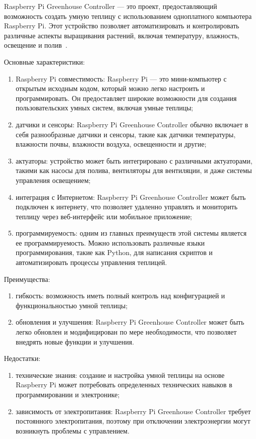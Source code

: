 Raspberry Pi Greenhouse Controller --- это проект, предоставляющий возможность создать умную теплицу с использованием одноплатного компьютера Raspberry Pi. Этот устройство позволяет автоматизировать и контролировать различные аспекты выращивания растений, включая температуру, влажность, освещение и полив~\cite{Raspberry}. 

Основные характеристики:

\begin{enumerate}
    \item Raspberry Pi совместимость: Raspberry Pi --- это мини-компьютер с открытым исходным кодом, который можно легко настроить и программировать. Он предоставляет широкие возможности для создания пользовательских умных систем, включая умные теплицы;
    \item датчики и сенсоры: Raspberry Pi Greenhouse Controller обычно включает в себя разнообразные датчики и сенсоры, такие как датчики температуры, влажности почвы, влажности воздуха, освещенности и другие;
    \item актуаторы: устройство может быть интегрировано с различными актуаторами, такими как насосы для полива, вентиляторы для вентиляции, и даже системы управления освещением;
    \item интеграция с Интернетом: Raspberry Pi Greenhouse Controller может быть подключен к интернету, что позволяет удаленно управлять и мониторить теплицу через веб-интерфейс или мобильное приложение;
    \item программируемость: одним из главных преимуществ этой системы является ее программируемость. Можно использовать различные языки программирования, такие как Python, для написания скриптов и автоматизировать процессы управления теплицей.
\end{enumerate}

Преимущества:

\begin{enumerate}
    \item гибкость: возможность иметь полный контроль над конфигурацией и функциональностью умной теплицы;
    \item обновления и улучшения: Raspberry Pi Greenhouse Controller может быть легко обновлен и модифицирован по мере необходимости, что позволяет внедрять новые функции и улучшения.
\end{enumerate}

Недостатки:

\begin{enumerate}
    \item технические знания: создание и настройка умной теплицы на основе Raspberry Pi может потребовать определенных технических навыков в программировании и электронике;
    \item зависимость от электропитания: Raspberry Pi Greenhouse Controller требует постоянного электропитания, поэтому при отключении электроэнергии могут возникнуть проблемы с управлением.
\end{enumerate}

